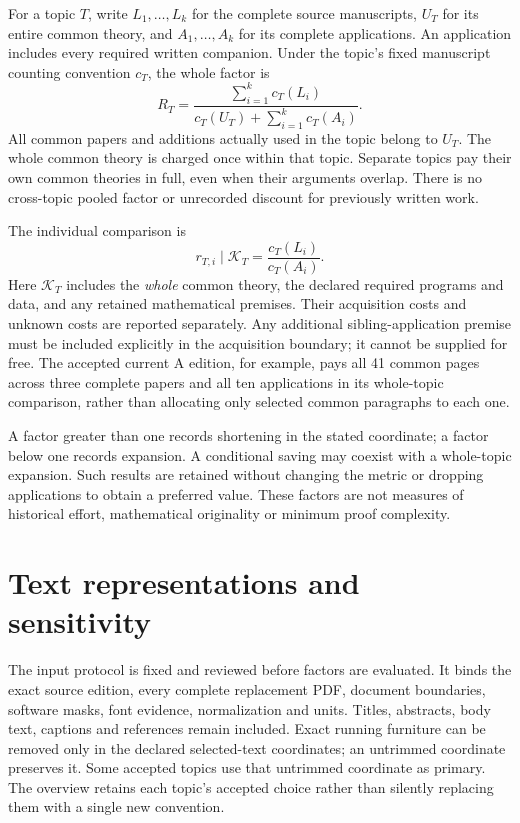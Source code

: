 \documentclass[11pt,a4paper]{article}
\begin{document}
For a topic $T$, write $L_1,\ldots,L_k$ for the complete source manuscripts,
$U_T$ for its entire common theory, and $A_1,\ldots,A_k$ for its complete
applications. An application includes every required written companion.
Under the topic's fixed manuscript counting convention $c_T$, the whole factor is
\[
 R_T=\frac{\sum_{i=1}^k c_T(L_i)}
 {c_T(U_T)+\sum_{i=1}^k c_T(A_i)}.
\]
All common papers and additions actually used in the topic belong to $U_T$.
The whole common theory is charged once within that topic. Separate topics pay
their own common theories in full, even when their arguments overlap. There is
no cross-topic pooled factor or unrecorded discount for previously written work.

The individual comparison is
\[
 r_{T,i}\mid\mathcal K_T=\frac{c_T(L_i)}{c_T(A_i)}.
\]
Here $\mathcal K_T$ includes the \emph{whole} common theory, the declared
required programs and data, and any retained mathematical premises. Their
acquisition costs and unknown costs are reported separately. Any additional
sibling-application premise must be included explicitly in the acquisition
boundary; it cannot be supplied for free. The accepted current A edition, for
example, pays all 41 common pages across three complete papers and all ten applications in its whole-topic
comparison, rather than allocating only selected common paragraphs to each one.

A factor greater than one records shortening in the stated coordinate; a factor
below one records expansion. A conditional saving may coexist with a whole-topic
expansion. Such results are retained without changing the metric or dropping
applications to obtain a preferred value. These factors are not measures of
historical effort, mathematical originality or minimum proof complexity.

\section{Text representations and sensitivity}

The input protocol is fixed and reviewed before factors are evaluated. It binds
the exact source edition, every complete replacement PDF, document boundaries,
software masks, font evidence, normalization and units. Titles, abstracts,
body text, captions and references remain included. Exact running furniture
can be removed only in the declared selected-text coordinates; an untrimmed
coordinate preserves it. Some accepted topics use that untrimmed coordinate
as primary. The overview retains each topic's accepted choice rather than
silently replacing them with a single new convention.
\end{document}
